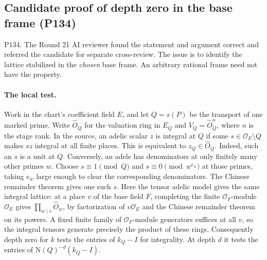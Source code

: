 \subsection{Candidate proof of depth zero in the base frame (P134)}
\label{sec:pending-p134}
\noindent\textsf{P134. The Round 21 AI reviewer found the statement and argument correct and referred the candidate for separate cross-review.}
The issue is to identify the lattice stabilized in the \emph{chosen}
base frame. An arbitrary rational frame need not have the property.

\paragraph{The local test.}
Work in the chart's coefficient field $E$, and let $Q=s(P)$ be the
transport of one marked prime. Write $\widehat O_Q$ for the valuation ring
in $E_Q$ and $V_Q=\widehat O_Q^n$, where $n$ is the stage rank.
In the source, an adelic scalar $z$ is integral at $Q$ if some
$s\in\mathcal O_E\setminus Q$ makes $sz$ integral at all finite places.
This is equivalent to $z_Q\in\widehat O_Q$. Indeed, such an $s$ is a
unit at $Q$. Conversely, an adele has denominators at only finitely many
other primes $w$. Choose $s\equiv1\pmod Q$ and
$s\equiv0\pmod{w^{e_w}}$ at those primes, taking $e_w$ large enough to
clear the corresponding denominators. The Chinese remainder theorem
gives one such $s$. Here the tensor adelic model gives the same integral
lattice: at a place $v$ of the base field $F$, completing the finite
$\mathcal O_F$-module $\mathcal O_E$ gives
$\prod_{w\mid v}\widehat O_w$, by factorization of $v\mathcal O_E$ and
the Chinese remainder theorem on its powers. A fixed finite family of
$\mathcal O_F$-module generators suffices at all $v$, so the integral
tensors generate precisely the product of these rings.
Consequently depth zero for $k$ tests the entries of $k_Q-I$ for
integrality. At depth $d$ it tests the entries of
$\mathrm N(Q)^{-d}(k_Q-I)$.


